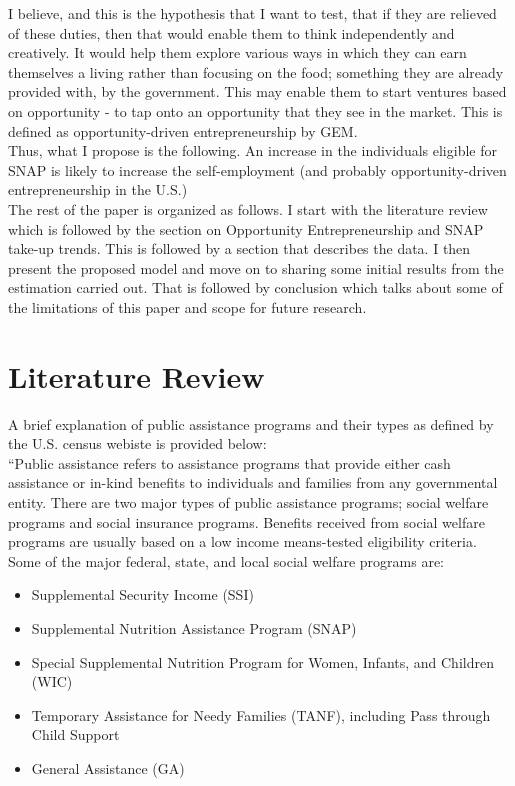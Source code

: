 \documentclass[12pt]{article}
\begin{document}
\begin{titlingpage}
I believe, and this is the hypothesis that I want to test, that if they are relieved of these duties, then that would enable them to think independently and creatively. It would help them explore various ways in which they can earn themselves a living rather than focusing on the food; something they are already provided with, by the government. This may enable them to start ventures based on opportunity - to tap onto an opportunity that they see in the market. This is defined as opportunity-driven entrepreneurship by GEM. \\

Thus, what I propose is the following. An increase in the individuals eligible for SNAP is likely to increase the self-employment (and probably opportunity-driven entrepreneurship in the U.S.) \\


The rest of the paper is organized as follows. I start with the literature review which is followed by the section on Opportunity Entrepreneurship and SNAP take-up trends. This is followed by a section that describes the data. I then present the proposed model and move on to sharing some initial results from the estimation carried out. That is followed by conclusion which talks about some of the limitations of this paper and scope for future research. \\


\section*{Literature Review}

A brief explanation of public assistance programs and their types as defined by the U.S. census webiste is provided below: \\

``Public assistance refers to assistance programs that provide either cash assistance or in-kind benefits to individuals and families from any governmental entity. There are two major types of public assistance programs; social welfare programs and social insurance programs. Benefits received from social welfare programs are usually based on a low income means-tested eligibility criteria. \\

Some of the major federal, state, and local social welfare programs are:
\begin{itemize}
\item Supplemental Security Income (SSI)
\item Supplemental Nutrition Assistance Program (SNAP)
\item Special Supplemental Nutrition Program for Women, Infants, and Children (WIC)
\item Temporary Assistance for Needy Families (TANF), including Pass through Child Support
\item General Assistance (GA) \\
\end{itemize}


\end{titlingpage}
\end{document}
